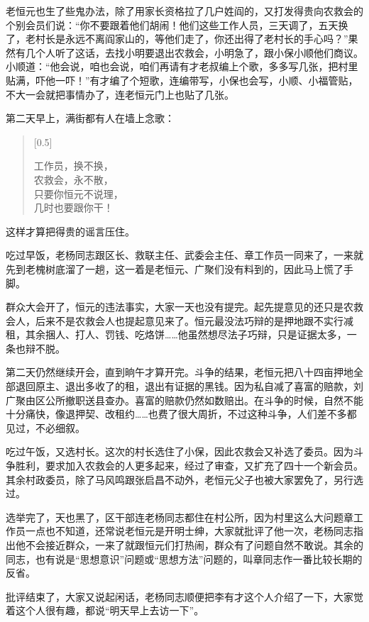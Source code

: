 \documentclass[12pt,UTF-8,openany]{ctexbook}
\begin{document}
\begin{normalsize}
    老恒元也生了些鬼办法，除了用家长资格拉了几户姓阎的，又打发得贵向农救会的个别会员们说：“你不要跟着他们胡闹！他们这些工作人员，三天调了，五天换了，老村长是永远不离阎家山的，等他们走了，你还出得了老村长的手心吗？”果然有几个人听了这话，去找小明要退出农救会，小明急了，跟小保小顺他们商议。小顺道：“他会说，咱也会说，咱们再请有才老叔编上个歌，多多写几张，把村里贴满，吓他一吓！”有才编了个短歌，连编带写，小保也会写，小顺、小福管贴，不大一会就把事情办了，连老恒元门上也贴了几张。
    
    第二天早上，满街都有人在墙上念歌：
    
    \begin{verse}[0.5\linewidth]
    
    工作员，换不换，\\农救会，永不散，\\只要你恒元不说理，\\几时也要跟你干！
    
    \end{verse}
    
    这样才算把得贵的谣言压住。
    
    吃过早饭，老杨同志跟区长、救联主任、武委会主任、章工作员一同来了，一来就先到老槐树底溜了一趟，这一着是老恒元、广聚们没有料到的，因此马上慌了手脚。
    
    群众大会开了，恒元的违法事实，大家一天也没有提完。起先提意见的还只是农救会人，后来不是农救会人也提起意见来了。恒元最没法巧辩的是押地跟不实行减租，其余捆人、打人、罚钱、吃烙饼……他虽然想尽法子巧辩，只是证据太多，一条也辩不脱。
    
    第二天仍然继续开会，直到晌午才算开完。斗争的结果，老恒元把八十四亩押地全部退回原主、退出多收了的租，退出有证据的黑钱。因为私自减了喜富的赔款，刘广聚由区公所撤职送县查办。喜富的赔款仍然如数赔出。在斗争的时候，自然不能十分痛快，像退押契、改租约……也费了很大周折，不过这种斗争，人们差不多都见过，不必细叙。
    
    吃过午饭，又选村长。这次的村长选住了小保，因此农救会又补选了委员。因为斗争胜利，要求加入农救会的人更多起来，经过了审查，又扩充了四十一个新会员。其余村政委员，除了马风鸣跟张启昌不动外，老恒元父子也被大家罢免了，另行选过。
    
    选举完了，天也黑了，区干部连老杨同志都住在村公所，因为村里这么大问题章工作员一点也不知道，还常说老恒元是开明士绅，大家就批评了他一次，老杨同志指出他不会接近群众，一来了就跟恒元们打热闹，群众有了问题自然不敢说。其余的同志，也有说是“思想意识”问题或“思想方法”问题的，叫章同志作一番比较长期的反省。
    
    批评结束了，大家又说起闲话，老杨同志顺便把李有才这个人介绍了一下，大家觉着这个人很有趣，都说“明天早上去访一下”。
    
\end{normalsize}
\end{document}
